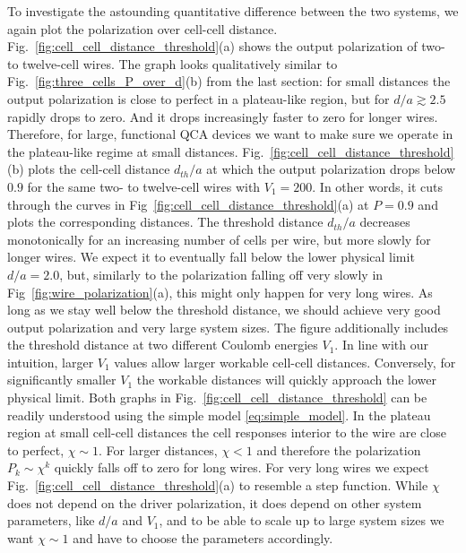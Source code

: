 To investigate the astounding quantitative difference between the two systems,
we again plot the polarization over cell-cell distance.
Fig.~\ref{fig:cell_cell_distance_threshold}(a) shows the output polarization of
two- to twelve-cell wires. The graph looks qualitatively similar to
Fig.~\ref{fig:three_cells_P_over_d}(b) from the last section: for small
distances the output polarization is close to perfect in a plateau-like region,
but for $d/a \gtrsim 2.5$ rapidly drops to zero. And it drops increasingly
faster to zero for longer wires. Therefore, for large, functional QCA devices we
want to make sure we operate in the plateau-like regime at small distances.
Fig.~\ref{fig:cell_cell_distance_threshold}(b) plots the cell-cell distance
$d_{th}/a$ at which the output polarization drops below $0.9$ for the same two-
to twelve-cell wires with $V_1 = 200$. In other words, it cuts through the
curves in Fig~\ref{fig:cell_cell_distance_threshold}(a) at $P = 0.9$ and plots
the corresponding distances. The threshold distance $d_{th}/a$ decreases
monotonically for an increasing number of cells per wire, but more slowly for
longer wires. We expect it to eventually fall below the lower physical limit
$d/a = 2.0$, but, similarly to the polarization falling off very slowly in
Fig~\ref{fig:wire_polarization}(a), this might only happen for very long wires.
As long as we stay well below the threshold distance, we should achieve very
good output polarization and very large system sizes. The figure additionally
includes the threshold distance at two different Coulomb energies $V_1$. In line
with our intuition, larger $V_1$ values allow larger workable cell-cell
distances.  Conversely, for significantly smaller $V_1$ the workable distances
will quickly approach the lower physical limit. Both graphs in
Fig.~\ref{fig:cell_cell_distance_threshold} can be readily understood using the
simple model \eqref{eq:simple_model}. In the plateau region at small cell-cell
distances the cell responses interior to the wire are close to perfect, $\chi
\sim 1$. For larger distances, $\chi < 1$ and therefore the polarization $P_k
\sim \chi^k$ quickly falls off to zero for long wires. For very long wires we
expect Fig.~\ref{fig:cell_cell_distance_threshold}(a) to resemble a step
function. While $\chi$ does not depend on the driver polarization, it does
depend on other system parameters, like $d/a$ and $V_1$, and to be able to scale
up to large system sizes we want $\chi \sim 1$ and have to choose the parameters
accordingly.

